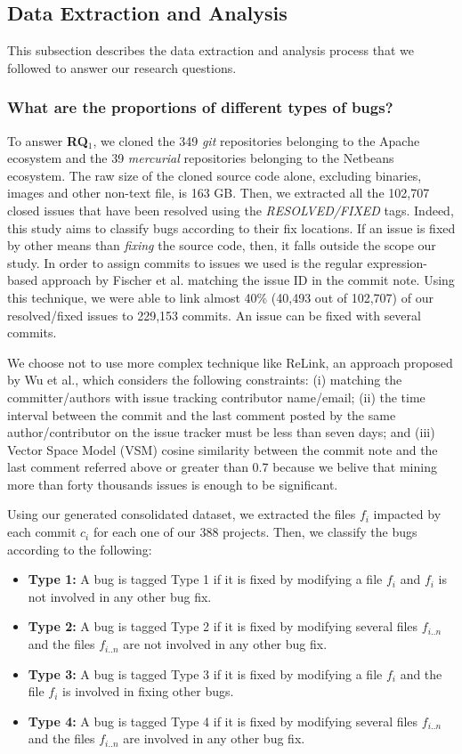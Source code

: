 
\subsection{Data Extraction and Analysis}

This subsection describes the data extraction and analysis process that we followed to answer our research questions.

\subsubsection{What are the proportions of different types of bugs?} To answer {\bf RQ$_1$}, we cloned the 349 {\it git} repositories belonging to the Apache ecosystem and the 39 {\it mercurial} repositories belonging to the Netbeans ecosystem.
The raw size of the cloned source code alone, excluding binaries, images and other non-text file, is 163 GB.
Then, we extracted all the 102,707 closed issues that have been resolved using the {\it RESOLVED/FIXED} tags.
Indeed, this study aims to classify bugs according to their fix locations.
If an issue is fixed by other means than {\it fixing} the source code, then, it falls outside the scope our study.
In order to assign commits to issues we used is the regular expression-based approach by Fischer et al. \cite{Fischer} matching the issue ID in the commit note.
Using this technique, we were able to link almost 40\% (40,493 out of 102,707) of our resolved/fixed issues to 229,153 commits.
An issue can be fixed with several commits.

We choose not to use more complex technique like ReLink, an approach proposed by Wu et al.\cite{Wu2011}, which considers the following constraints: (i) matching the committer/authors with issue tracking contributor name/email; (ii) the time interval between the commit and the last comment posted by the same author/contributor on the issue tracker must be less than seven days; and (iii) Vector Space Model (VSM) cosine similarity between the commit note and the last comment referred above or greater than 0.7 because we belive that mining more than forty thousands issues is enough to be significant.

Using our generated consolidated dataset, we extracted the files $f_i$ impacted by each commit $c_i$ for each one of our 388 projects.
Then, we classify the bugs according to the following:

\begin{itemize}
  \item {\bf Type 1:} A bug is tagged Type 1 if it is fixed by modifying a file $f_i$ and $f_i$ is not involved in any other bug fix.
  \item {\bf Type 2:} A bug is tagged Type 2 if it is fixed by modifying several files $f_{i..n}$ and the files $f_{i..n}$ are not involved in any other bug fix.
  \item {\bf Type 3:} A bug is tagged Type 3 if it is fixed by modifying a file $f_{i}$ and the file $f_{i}$ is involved in fixing other bugs.
  \item {\bf Type 4:} A bug is tagged Type 4 if it is fixed by modifying several files $f_{i..n}$ and the files $f_{i..n}$ are involved in any other bug fix.
\end{itemize}

